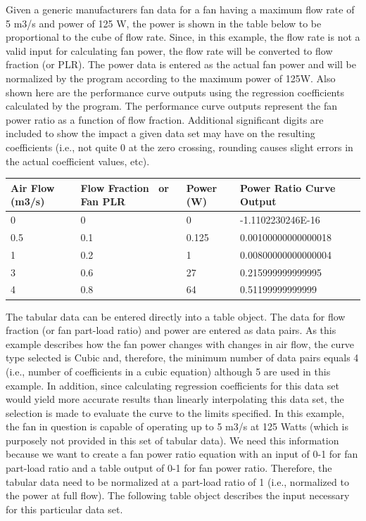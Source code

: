 Given a generic manufacturers fan data for a fan having a maximum flow rate of 5 m3/s and power of 125 W, the power is shown in the table below to be proportional to the cube of flow rate. Since, in this example, the flow rate is not a valid input for calculating fan power, the flow rate will be converted to flow fraction (or PLR). The power data is entered as the actual fan power and will be normalized by the program according to the maximum power of 125W. Also shown here are the performance curve outputs using the regression coefficients calculated by the program. The performance curve outputs represent the fan power ratio as a function of flow fraction. Additional significant digits are included to show the impact a given data set may have on the resulting coefficients (i.e., not quite 0 at the zero crossing, rounding causes slight errors in the actual coefficient values, etc).

\begin{longtable}[c]{p{1.5in}p{1.5in}p{1.2in}p{1.8in}}
\toprule 
Air Flow (m3/s) & Flow Fraction~ or Fan PLR & Power (W) & Power Ratio Curve Output \tabularnewline \midrule
\endhead
0 & 0 & 0 & -1.1102230246E-16 \tabularnewline
0.5 & 0.1 & 0.125 & 0.00100000000000018 \tabularnewline
1 & 0.2 & 1 & 0.00800000000000004 \tabularnewline
3 & 0.6 & 27 & 0.215999999999995 \tabularnewline
4 & 0.8 & 64 & 0.51199999999999 \tabularnewline
\bottomrule
\end{longtable}

The tabular data can be entered directly into a table object. The data for flow fraction (or fan part-load ratio) and power are entered as data pairs. As this example describes how the fan power changes with changes in air flow, the curve type selected is Cubic and, therefore, the minimum number of data pairs equals 4 (i.e., number of coefficients in a cubic equation) although 5 are used in this example. In addition, since calculating regression coefficients for this data set would yield more accurate results than linearly interpolating this data set, the selection is made to evaluate the curve to the limits specified. In this example, the fan in question is capable of operating up to 5 m3/s at 125 Watts (which is purposely not provided in this set of tabular data). We need this information because we want to create a fan power ratio equation with an input of 0-1 for fan part-load ratio and a table output of 0-1 for fan power ratio. Therefore, the tabular data need to be normalized at a part-load ratio of 1 (i.e., normalized to the power at full flow). The following table object describes the input necessary for this particular data set.

